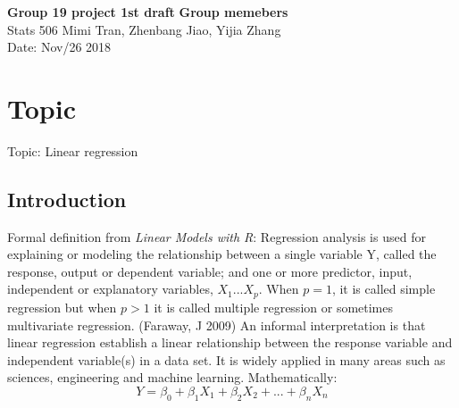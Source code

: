 \documentclass[a4paper, 11pt]{article}
\begin{document}
\noindent
\large\textbf{Group 19 project 1st draft} \hfill \textbf{Group memebers} \\
\normalsize Stats 506 \hfill  Mimi Tran, Zhenbang Jiao, Yijia Zhang \\
Date: Nov/26 2018

\section{Topic}
Topic: Linear regression
\subsection{Introduction}
Formal definition from \emph{Linear Models with R}: Regression analysis is used for explaining or modeling the relationship between a single variable Y, called the response, output or dependent variable; and one or more predictor, input, independent or explanatory variables, $X_1$...$X_p$. When $p=1$, it is called simple regression but when $p>1$ it is called multiple regression or sometimes multivariate regression. (Faraway, J 2009)\newline
An informal interpretation is that linear regression establish a linear relationship between the response variable and independent variable(s) in a data set. It is widely applied in many areas such as sciences, engineering and machine learning. \newline
Mathematically:
\begin{equation}
Y = \beta_0 + \beta_1 X_1 + \beta_2 X_2 + ... + \beta_n X_n
\end{equation}
\end{document}
